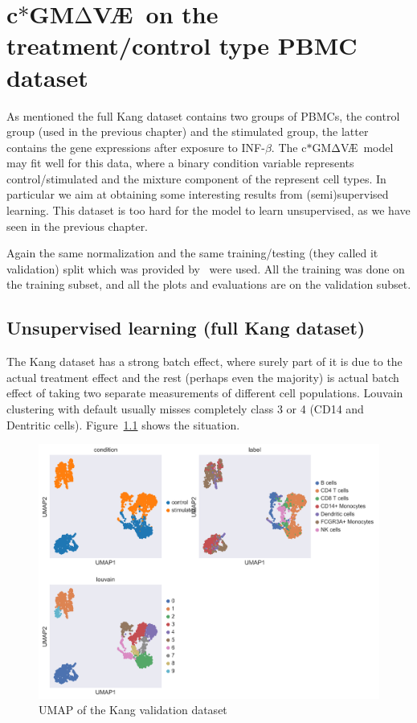\documentclass[11pt, a4paper]{report}
\theoremstyle{plain}
\theoremstyle{definition}
\theoremstyle{remark}
\newcommand{\gmvae}{c$\ast$GM$\mathrm{\Delta}$V\AE~}
\begin{document}
\chapter{\gmvae on the treatment/control type PBMC dataset}
As mentioned the full Kang dataset contains two groups of PBMCs, 
the control group (used in the previous chapter) and the stimulated group, the latter contains the gene
expressions after exposure to INF-$\beta$.
The \gmvae model may fit well for this data, where a binary condition variable
represents control/stimulated and the mixture component of the represent cell
types. In particular we aim at obtaining some interesting results from
(semi)supervised learning. This dataset is too hard for the model to learn
unsupervised, as we have seen in the previous chapter.

Again the same normalization and the same training/testing (they called it validation) split
which was provided by~\cite{lotfollahi2019scgen} were used. All the training was done on
the training subset, and all the plots and evaluations are on the validation
subset.

\section{Unsupervised learning (full Kang dataset)}

The Kang dataset has a strong batch effect, where surely part of it is due to
the actual treatment effect and the rest (perhaps even the majority) is 
actual batch effect of taking two separate measurements of different cell
populations.
Louvain clustering with default usually misses completely class 3 or 4 (CD14 and
Dentritic cells).
Figure~\ref{fig:Kang_val_full} shows the situation.

\begin{figure}[h]
\centering
\includegraphics[width=1.1\textwidth]{images/Kang_val_full.png}
\caption{
UMAP of the Kang validation dataset
}
\label{fig:Kang_val_full}
\end{figure}
\end{document}

